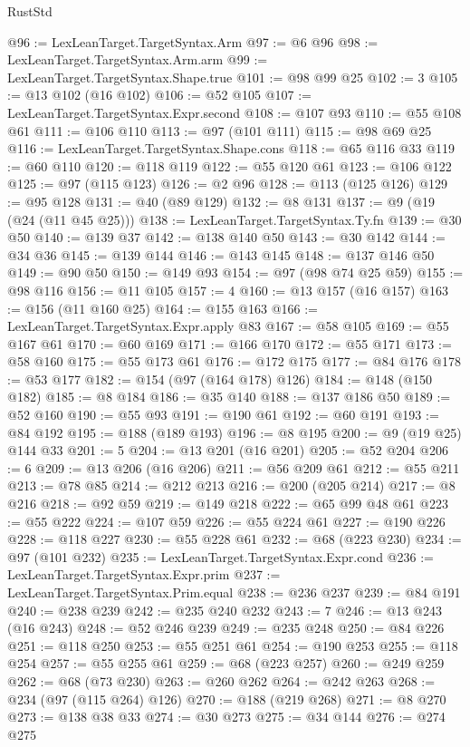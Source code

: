 \begin{lexlean}{RustStd}
\begin{coremodule}
@96 := LexLeanTarget.TargetSyntax.Arm
@97 := @6 @96
@98 := LexLeanTarget.TargetSyntax.Arm.arm
@99 := LexLeanTarget.TargetSyntax.Shape.true
@101 := @98 @99 @25
@102 := 3
@105 := @13 @102 (@16 @102)
@106 := @52 @105
@107 := LexLeanTarget.TargetSyntax.Expr.second
@108 := @107 @93
@110 := @55 @108 @61
@111 := @106 @110
@113 := @97 (@101 @111)
@115 := @98 @69 @25
@116 := LexLeanTarget.TargetSyntax.Shape.cons
@118 := @65 @116 @33
@119 := @60 @110
@120 := @118 @119
@122 := @55 @120 @61
@123 := @106 @122
@125 := @97 (@115 @123)
@126 := @2 @96
@128 := @113 (@125 @126)
@129 := @95 @128
@131 := @40 (@89 @129)
@132 := @8 @131
@137 := @9 (@19 (@24 (@11 @45 @25)))
@138 := LexLeanTarget.TargetSyntax.Ty.fn
@139 := @30 @50
@140 := @139 @37
@142 := @138 @140 @50
@143 := @30 @142
@144 := @34 @36
@145 := @139 @144
@146 := @143 @145
@148 := @137 @146 @50
@149 := @90 @50
@150 := @149 @93
@154 := @97 (@98 @74 @25 @59)
@155 := @98 @116
@156 := @11 @105
@157 := 4
@160 := @13 @157 (@16 @157)
@163 := @156 (@11 @160 @25)
@164 := @155 @163
@166 := LexLeanTarget.TargetSyntax.Expr.apply @83
@167 := @58 @105
@169 := @55 @167 @61
@170 := @60 @169
@171 := @166 @170
@172 := @55 @171
@173 := @58 @160
@175 := @55 @173 @61
@176 := @172 @175
@177 := @84 @176
@178 := @53 @177
@182 := @154 (@97 (@164 @178) @126)
@184 := @148 (@150 @182)
@185 := @8 @184
@186 := @35 @140
@188 := @137 @186 @50
@189 := @52 @160
@190 := @55 @93
@191 := @190 @61
@192 := @60 @191
@193 := @84 @192
@195 := @188 (@189 @193)
@196 := @8 @195
@200 := @9 (@19 @25) @144 @33
@201 := 5
@204 := @13 @201 (@16 @201)
@205 := @52 @204
@206 := 6
@209 := @13 @206 (@16 @206)
@211 := @56 @209 @61
@212 := @55 @211
@213 := @78 @85
@214 := @212 @213
@216 := @200 (@205 @214)
@217 := @8 @216
@218 := @92 @59
@219 := @149 @218
@222 := @65 @99 @48 @61
@223 := @55 @222
@224 := @107 @59
@226 := @55 @224 @61
@227 := @190 @226
@228 := @118 @227
@230 := @55 @228 @61
@232 := @68 (@223 @230)
@234 := @97 (@101 @232)
@235 := LexLeanTarget.TargetSyntax.Expr.cond
@236 := LexLeanTarget.TargetSyntax.Expr.prim
@237 := LexLeanTarget.TargetSyntax.Prim.equal
@238 := @236 @237
@239 := @84 @191
@240 := @238 @239
@242 := @235 @240 @232
@243 := 7
@246 := @13 @243 (@16 @243)
@248 := @52 @246 @239
@249 := @235 @248
@250 := @84 @226
@251 := @118 @250
@253 := @55 @251 @61
@254 := @190 @253
@255 := @118 @254
@257 := @55 @255 @61
@259 := @68 (@223 @257)
@260 := @249 @259
@262 := @68 (@73 @230)
@263 := @260 @262
@264 := @242 @263
@268 := @234 (@97 (@115 @264) @126)
@270 := @188 (@219 @268)
@271 := @8 @270
@273 := @138 @38 @33
@274 := @30 @273
@275 := @34 @144
@276 := @274 @275

\end{coremodule}
\end{lexlean}
